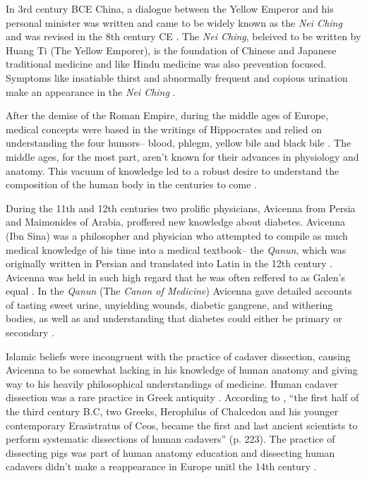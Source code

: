 \documentclass[12pt]{article}
\begin{document}
In 3rd century BCE China, a dialogue between the Yellow Emperor and his personal minister was written and came to be widely known as the \textit{Nei Ching} and was revised in the 8th century CE \citep{veith_1950_huang}. The \textit{Nei Ching}, beleived to be written by Huang Ti (The Yellow Emporer), is the foundation of Chinese and Japanese traditional medicine and like Hindu medicine was also prevention focused. Symptoms like insatiable thirst and abnormally frequent and copious urination make an appearance in the \textit{Nei Ching} \citep{veith_1950_huang}. 

After the demise of the Roman Empire, during the middle ages of Europe, medical concepts were based in the writings of Hippocrates and relied on understanding the four humors-- blood, phlegm, yellow bile and black bile \citep{lloyd_1983_hippocratic}. The middle ages, for the most part, aren't known for their advances in physiology and anatomy. This vacuum of knowledge led to a robust desire to understand the composition of the human body in the centuries to come \citep{sanders_2001_philatelic}. 

During the 11th and 12th centuries two prolific physicians, Avicenna from Persia and Maimonides of Arabia, proffered new knowledge about diabetes. Avicenna (Ibn Sina) was a philosopher and physician who attempted to compile as much medical knowledge of his time into a medical textbook-- the \textit{Qanun}, which was originally written in Persian and translated into Latin in the 12th century \citep{avicenna_1930_treatise}. Avicenna was held in such high regard that he was often reffered to as Galen's equal \citep{sanders_2001_philatelic}. In the \textit{Qanun} (The \textit{Canon of Medicine}) Avicenna gave detailed accounts of tasting sweet urine, unyielding wounds, diabetic gangrene, and withering bodies, as well as and understanding that diabetes could either be primary or secondary \citep{avicenna_1930_treatise}. 

Islamic beliefs were incongruent with the practice of cadaver dissection, causing Avicenna to be somewhat lacking in his knowledge of human anatomy and giving way to his heavily philosophical understandings of medicine. Human cadaver dissection was a rare practice in Greek antiquity \citep{sanders_2001_diabetes}. According to \citet{von_1992_discovery}, ``the first half of the third century B.C, two Greeks, Herophilus of Chalcedon and his younger contemporary Erasistratus of Ceos, became the first and last ancient scientists to perform systematic dissections of human cadavers'' (p. 223). The practice of dissecting pigs was part of human anatomy education and dissecting human cadavers didn't make a reappearance in Europe unitl the 14th century \citep{von_1992_discovery}. 
\end{document}
